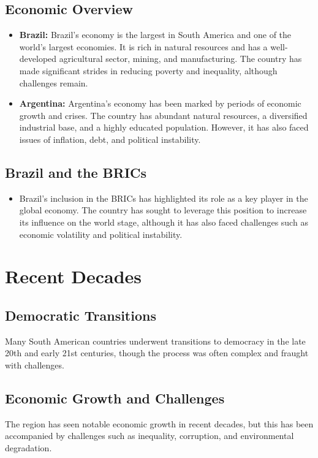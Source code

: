 \documentclass[a4paper,12pt]{book}
\begin{document}
\subsection{Economic Overview}
\label{subsec:economic-overview}
\begin{itemize}
    \item \textbf{Brazil:} Brazil's economy is the largest in South America and one of the world's largest economies. It is rich in natural resources and has a well-developed agricultural sector, mining, and manufacturing. The country has made significant strides in reducing poverty and inequality, although challenges remain.
    \item \textbf{Argentina:} Argentina's economy has been marked by periods of economic growth and crises. The country has abundant natural resources, a diversified industrial base, and a highly educated population. However, it has also faced issues of inflation, debt, and political instability.
\end{itemize}

\subsection{Brazil and the BRICs}
\label{subsec:brazil-brics}
\begin{itemize}
    \item Brazil's inclusion in the BRICs has highlighted its role as a key player in the global economy. The country has sought to leverage this position to increase its influence on the world stage, although it has also faced challenges such as economic volatility and political instability.
\end{itemize}

\section{Recent Decades}
\label{sec:recent-decades}

\subsection{Democratic Transitions}
\label{subsec:democratic-transitions}
Many South American countries underwent transitions to democracy in the late 20th and early 21st centuries, though the process was often complex and fraught with challenges.

\subsection{Economic Growth and Challenges}
\label{subsec:economic-growth-challenges}
The region has seen notable economic growth in recent decades, but this has been accompanied by challenges such as inequality, corruption, and environmental degradation.
\end{document}
